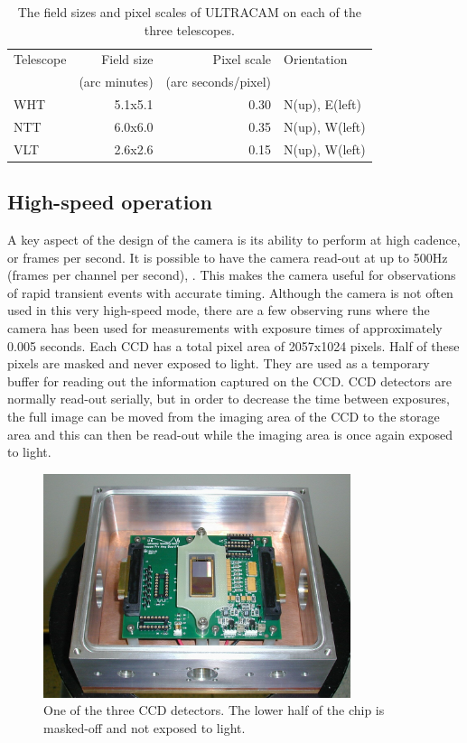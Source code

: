\begin{table}
	\caption{The field sizes and pixel scales of ULTRACAM on each of the three telescopes.}
	\begin{tabular}{l r r l}
		\hline
		Telescope & Field size        & Pixel scale & Orientation \\
		                  & (arc minutes) &   (arc seconds/pixel) & \\
		\hline
		WHT & 5.1x5.1 & 0.30 & N(up), E(left)\\
		NTT & 6.0x6.0 & 0.35 & N(up), W(left)\\
		VLT & 2.6x2.6 & 0.15 & N(up), W(left)\\
		\hline
	\end{tabular}
	\label{tab:pixelscale}
\end{table}

\subsection{High-speed operation}
A key aspect of the design of the camera is its ability to perform at high cadence, or frames per second. It is possible to have the camera read-out at up to 500Hz (frames per channel per second), \citep{dhillon07}. This makes the camera useful for observations of rapid transient events with accurate timing. Although the camera is not often used in this very high-speed mode, there are a few observing runs where the camera has been used for measurements with exposure times of approximately 0.005 seconds. Each CCD has a total pixel area of 2057x1024 pixels. Half of these pixels are masked and never exposed to light. They are used as a temporary buffer for reading out the information captured on the CCD. CCD detectors are normally read-out serially, but in order to decrease the time between exposures, the full image can be moved from the imaging area of the CCD to the storage area and this can then be read-out while the imaging area is once again exposed to light. 

\begin{figure}
\centering
\includegraphics[width=90mm]{images/ccd.png}
\caption{One of the three CCD detectors. The lower half of the chip is masked-off and not exposed to light.}
\label{fig2}
\end{figure}

